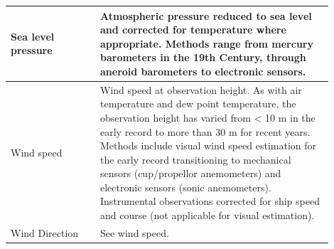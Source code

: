 \begin{table}[h]
\begin{tabular}{|p{0.25\linewidth}|p{0.65\linewidth}|}
\hline
Sea level pressure & Atmospheric pressure reduced to sea level and corrected for temperature where appropriate. Methods range from mercury barometers in the 19th Century, through aneroid barometers to electronic sensors.\\
\hline
Wind speed & Wind speed at observation height. As with air temperature and dew point temperature, the observation height has varied from < 10 m in the early record to more than 30 m for recent years. Methods include visual wind speed estimation for the early record transitioning to mechanical sensors (cup/propellor anemometers) and electronic sensors (sonic anemometers). Instrumental observations corrected for ship speed and course (not applicable for visual estimation).\\
\hline
Wind Direction & See wind speed.\\
\hline
\end{tabular}
\end{table}

